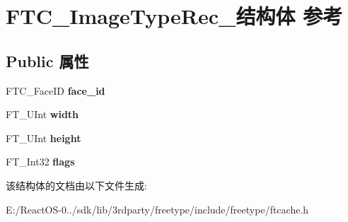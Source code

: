 \hypertarget{struct_f_t_c___image_type_rec__}{}\section{F\+T\+C\+\_\+\+Image\+Type\+Rec\+\_\+结构体 参考}
\label{struct_f_t_c___image_type_rec__}
\subsection*{Public 属性}
\begin{DoxyCompactItemize}
\item 
\mbox{\label{struct_f_t_c___image_type_rec___a9851b8d4a06baacd18d5b9856fd85abd}} 
F\+T\+C\+\_\+\+Face\+ID {\bfseries face\+\_\+id}
\item 
\mbox{\label{struct_f_t_c___image_type_rec___abd2bc251e7dbded1932e25841a41ab71}} 
F\+T\+\_\+\+U\+Int {\bfseries width}
\item 
\mbox{\label{struct_f_t_c___image_type_rec___a29ac83aa58a7d9d669d27ddcbb970f95}} 
F\+T\+\_\+\+U\+Int {\bfseries height}
\item 
\mbox{\label{struct_f_t_c___image_type_rec___a391782ed8c67de86591c71f276ea6454}} 
F\+T\+\_\+\+Int32 {\bfseries flags}
\end{DoxyCompactItemize}


该结构体的文档由以下文件生成\+:\begin{DoxyCompactItemize}
\item 
E\+:/\+React\+O\+S-\/0../sdk/lib/3rdparty/freetype/include/freetype/ftcache.\+h\end{DoxyCompactItemize}
